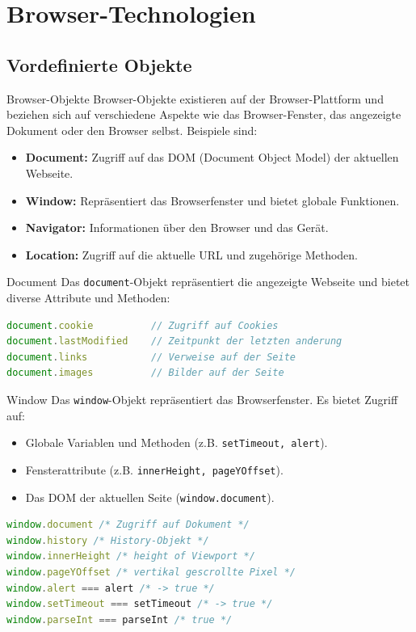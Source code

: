 \section{Browser-Technologien}

\subsection{Vordefinierte Objekte}
\begin{concept}{Browser-Objekte}
Browser-Objekte existieren auf der Browser-Plattform und beziehen sich auf verschiedene Aspekte wie das Browser-Fenster, das angezeigte Dokument oder den Browser selbst. Beispiele sind:
\begin{itemize}
  \item \textbf{Document:} Zugriff auf das DOM (Document Object Model) der aktuellen Webseite.
  \item \textbf{Window:} Repräsentiert das Browserfenster und bietet globale Funktionen.
  \item \textbf{Navigator:} Informationen über den Browser und das Gerät.
  \item \textbf{Location:} Zugriff auf die aktuelle URL und zugehörige Methoden.
\end{itemize}
\end{concept}

\begin{definition}{Document}
Das \texttt{document}-Objekt repräsentiert die angezeigte Webseite und bietet diverse Attribute und Methoden:
\begin{lstlisting}[language=JavaScript, style=basesmol]
document.cookie          // Zugriff auf Cookies
document.lastModified    // Zeitpunkt der letzten anderung
document.links           // Verweise auf der Seite
document.images          // Bilder auf der Seite
\end{lstlisting}
\end{definition}

\begin{definition}{Window}
Das \texttt{window}-Objekt repräsentiert das Browserfenster. Es bietet Zugriff auf:
\begin{itemize}
  \item Globale Variablen und Methoden (z.B. \texttt{setTimeout, alert}).
  \item Fensterattribute (z.B. \texttt{innerHeight, pageYOffset}).
  \item Das DOM der aktuellen Seite (\texttt{window.document}).
\end{itemize}
\begin{lstlisting}[language=JavaScript, style=basesmol]
window.document /* Zugriff auf Dokument */
window.history /* History-Objekt */
window.innerHeight /* height of Viewport */
window.pageYOffset /* vertikal gescrollte Pixel */
window.alert === alert /* -> true */
window.setTimeout === setTimeout /* -> true */
window.parseInt === parseInt /* true */
\end{lstlisting}
\end{definition}

